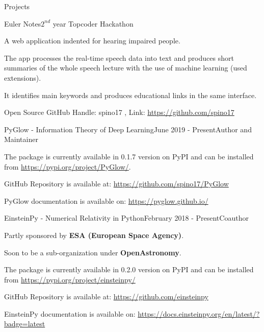 \documentclass{resume} %
\begin{document}
\begin{rSection}{Projects}
\begin{rSubsection}{Euler Notes}{$2^{nd}$ year Topcoder Hackathon}{}{}
\item A web application indented for hearing impaired people. 
\item The app processes the real-time speech data into text and produces short summaries of the whole speech lecture with the use of machine learning (used extensions). 
\item It identifies main keywords and produces educational links in the same interface.
\end{rSubsection}

\end{rSection}

\newpage
\begin{rSection}{Open Source}
GitHub Handle: spino17 , Link: \url{https://github.com/spino17} \\
\begin{rSubsection}{PyGlow - Information Theory of Deep Learning}{June 2019 - Present}{Author and Maintainer}{}
\item The package is currently available in 0.1.7 version on PyPI and can be installed from \url{https://pypi.org/project/PyGlow/}.
\item GitHub Repository is available at: \url{https://github.com/spino17/PyGlow}
\item PyGlow documentation is available on: \url{https://pyglow.github.io/}
\end{rSubsection}
\begin{rSubsection}{EinsteinPy - Numerical Relativity in Python}{February 2018 - Present}{Coauthor}{}
\item Partly sponsored by \textbf{ESA (European Space Agency)}.
\item Soon to be a sub-organization under \textbf{OpenAstronomy}.
\item The package is currently available in 0.2.0 version on PyPI and can be installed from  \url{https://pypi.org/project/einsteinpy/}
\item GitHub Repository is available at:
\url{https://github.com/einsteinpy}
\item EinsteinPy documentation is available on:
\url{https://docs.einsteinpy.org/en/latest/?badge=latest}
\end{rSubsection}

\end{rSection}
\end{document}
